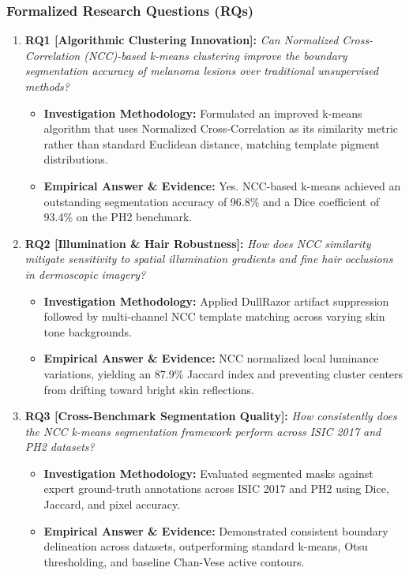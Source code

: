 \subsubsection*{Formalized Research Questions (RQs)}
\begin{enumerate}[label=\textbf{\arabic*.}, leftmargin=*]
  \item \textbf{RQ1 [Algorithmic Clustering Innovation]:} \textit{Can Normalized Cross-Correlation (NCC)-based k-means clustering improve the boundary segmentation accuracy of melanoma lesions over traditional unsupervised methods?}
  \begin{itemize}[leftmargin=1.5em]
    \item \textbf{Investigation Methodology:} Formulated an improved k-means algorithm that uses Normalized Cross-Correlation as its similarity metric rather than standard Euclidean distance, matching template pigment distributions.
    \item \textbf{Empirical Answer \& Evidence:} Yes. NCC-based k-means achieved an outstanding segmentation accuracy of 96.8\% and a Dice coefficient of 93.4\% on the PH2 benchmark.
  \end{itemize}
  \item \textbf{RQ2 [Illumination \& Hair Robustness]:} \textit{How does NCC similarity mitigate sensitivity to spatial illumination gradients and fine hair occlusions in dermoscopic imagery?}
  \begin{itemize}[leftmargin=1.5em]
    \item \textbf{Investigation Methodology:} Applied DullRazor artifact suppression followed by multi-channel NCC template matching across varying skin tone backgrounds.
    \item \textbf{Empirical Answer \& Evidence:} NCC normalized local luminance variations, yielding an 87.9\% Jaccard index and preventing cluster centers from drifting toward bright skin reflections.
  \end{itemize}
  \item \textbf{RQ3 [Cross-Benchmark Segmentation Quality]:} \textit{How consistently does the NCC k-means segmentation framework perform across ISIC 2017 and PH2 datasets?}
  \begin{itemize}[leftmargin=1.5em]
    \item \textbf{Investigation Methodology:} Evaluated segmented masks against expert ground-truth annotations across ISIC 2017 and PH2 using Dice, Jaccard, and pixel accuracy.
    \item \textbf{Empirical Answer \& Evidence:} Demonstrated consistent boundary delineation across datasets, outperforming standard k-means, Otsu thresholding, and baseline Chan-Vese active contours.

\end{itemize}
\end{enumerate}
